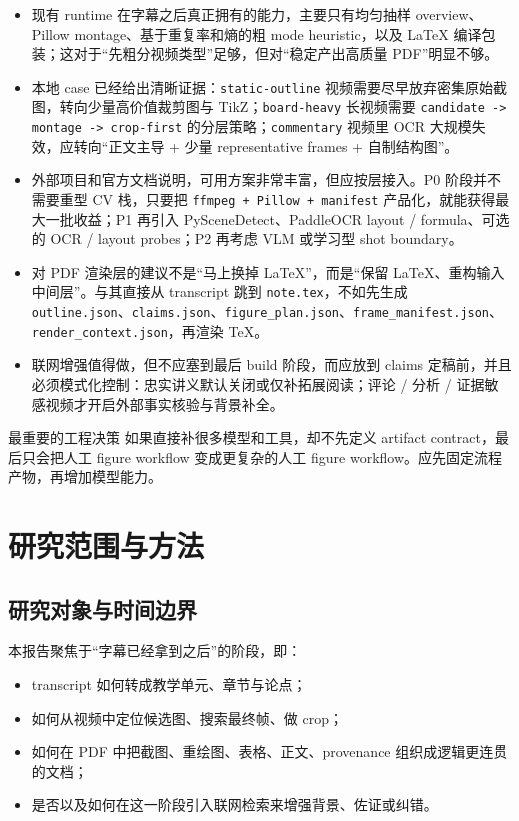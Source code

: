 \documentclass[a4paper]{article}
\begin{document}
\begin{itemize}
\item 现有 runtime 在字幕之后真正拥有的能力，主要只有均匀抽样 overview、Pillow montage、基于重复率和熵的粗 mode heuristic，以及 LaTeX 编译包装；这对于“先粗分视频类型”足够，但对“稳定产出高质量 PDF”明显不够。
\item 本地 case 已经给出清晰证据：\texttt{static-outline} 视频需要尽早放弃密集原始截图，转向少量高价值裁剪图与 TikZ；\texttt{board-heavy} 长视频需要 \texttt{candidate -> montage -> crop-first} 的分层策略；\texttt{commentary} 视频里 OCR 大规模失效，应转向“正文主导 + 少量 representative frames + 自制结构图”。
\item 外部项目和官方文档说明，可用方案非常丰富，但应按层接入。P0 阶段并不需要重型 CV 栈，只要把 \texttt{ffmpeg + Pillow + manifest} 产品化，就能获得最大一批收益；P1 再引入 PySceneDetect、PaddleOCR layout / formula、可选的 OCR / layout probes；P2 再考虑 VLM 或学习型 shot boundary。
\item 对 PDF 渲染层的建议不是“马上换掉 LaTeX”，而是“保留 LaTeX、重构输入中间层”。与其直接从 transcript 跳到 \texttt{note.tex}，不如先生成 \texttt{outline.json}、\texttt{claims.json}、\texttt{figure\_plan.json}、\texttt{frame\_manifest.json}、\texttt{render\_context.json}，再渲染 TeX。
\item 联网增强值得做，但不应塞到最后 build 阶段，而应放到 claims 定稿前，并且必须模式化控制：忠实讲义默认关闭或仅补拓展阅读；评论 / 分析 / 证据敏感视频才开启外部事实核验与背景补全。
\end{itemize}

\begin{riskbox}{最重要的工程决策}
如果直接补很多模型和工具，却不先定义 artifact contract，最后只会把人工 figure workflow 变成更复杂的人工 figure workflow。应先固定流程产物，再增加模型能力。
\end{riskbox}

\section{研究范围与方法}

\subsection{研究对象与时间边界}

本报告聚焦于“字幕已经拿到之后”的阶段，即：

\begin{itemize}
\item transcript 如何转成教学单元、章节与论点；
\item 如何从视频中定位候选图、搜索最终帧、做 crop；
\item 如何在 PDF 中把截图、重绘图、表格、正文、provenance 组织成逻辑更连贯的文档；
\item 是否以及如何在这一阶段引入联网检索来增强背景、佐证或纠错。
\end{itemize}
\end{document}
